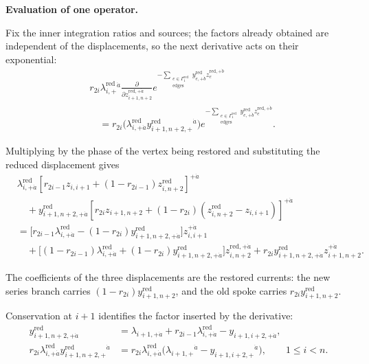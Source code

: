 \documentclass[11pt]{article}
\numberwithin{equation}{section}
\numberwithin{figure}{section}
\numberwithin{table}{section}
\begin{document}
\begin{proofbox}
\textbf{Evaluation of one operator.}

Fix the inner integration ratios and sources; the factors already obtained are independent of the displacements, so the next derivative acts on their exponential:
\begin{equation}\label{eq-fan-kernel-recursion}
\begin{aligned}
&r_{2i}\lambda_{i,+}^{\mathrm{red}}{}^{\dot a}
\frac{\partial}{\partial z_{i+1,n+2}^{\mathrm{red},+\dot a}}
e^{-\sum_{\substack{e\in\Gamma_1^{\mathrm{red}}\\\mathrm{edges}}}
y_{e,+\dot b}^{\mathrm{red}}z_e^{\mathrm{red},+\dot b}}\\
&\quad=r_{2i}\bigl(\lambda_{i,+\dot a}^{\mathrm{red}}
y_{i+1,n+2,+}^{\mathrm{red}}{}^{\dot a}\bigr)
e^{-\sum_{\substack{e\in\Gamma_1^{\mathrm{red}}\\\mathrm{edges}}}
y_{e,+\dot b}^{\mathrm{red}}z_e^{\mathrm{red},+\dot b}}.
\end{aligned}
\end{equation}

Multiplying by the phase of the vertex being restored and substituting the reduced displacement gives
\begin{equation*}
\begin{aligned}
&\lambda_{i,+\dot a}^{\mathrm{red}}
[r_{2i-1}z_{i,i+1}+(1-r_{2i-1})z_{i,n+2}^{\mathrm{red}}]^{+\dot a}\\
&\quad+y_{i+1,n+2,+\dot a}^{\mathrm{red}}
[r_{2i}z_{i+1,n+2}+(1-r_{2i})(z_{i,n+2}^{\mathrm{red}}-z_{i,i+1})]^{+\dot a}\\
&=\bigl[r_{2i-1}\lambda_{i,+\dot a}^{\mathrm{red}}
-(1-r_{2i})y_{i+1,n+2,+\dot a}^{\mathrm{red}}\bigr]z_{i,i+1}^{+\dot a}\\
&\quad+\bigl[(1-r_{2i-1})\lambda_{i,+\dot a}^{\mathrm{red}}
+(1-r_{2i})y_{i+1,n+2,+\dot a}^{\mathrm{red}}\bigr]z_{i,n+2}^{\mathrm{red},+\dot a}
+r_{2i}y_{i+1,n+2,+\dot a}^{\mathrm{red}}z_{i+1,n+2}^{+\dot a}.
\end{aligned}
\end{equation*}

The coefficients of the three displacements are the restored currents: the new series branch carries $(1-r_{2i})y_{i+1,n+2}^{\mathrm{red}}$, and the old spoke carries $r_{2i}y_{i+1,n+2}^{\mathrm{red}}$.

Conservation at $i+1$ identifies the factor inserted by the derivative:
\begin{equation}\label{eq-B-fan-first-merge}
\begin{aligned}
y_{i+1,n+2,+\dot a}^{\mathrm{red}}
&=\lambda_{i+1,+\dot a}+r_{2i-1}\lambda_{i,+\dot a}^{\mathrm{red}}
-y_{i+1,i+2,+\dot a},\\
r_{2i}\lambda_{i,+\dot a}^{\mathrm{red}}
y_{i+1,n+2,+}^{\mathrm{red}}{}^{\dot a}
&=r_{2i}\lambda_{i,+\dot a}^{\mathrm{red}}
\bigl(\lambda_{i+1,+}{}^{\dot a}-y_{i+1,i+2,+}{}^{\dot a}\bigr),
\qquad 1\le i<n.
\end{aligned}
\end{equation}


\end{proofbox}
\end{document}
